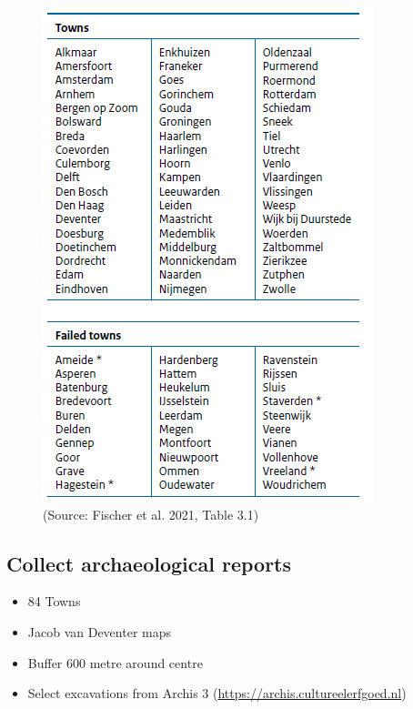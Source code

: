 \documentclass[
  letterpaper,
  DIV=11,
  numbers=noendperiod]{scrartcl}
\providecommand{\tightlist}{%
  \setlength{\itemsep}{0pt}\setlength{\parskip}{0pt}}\usepackage{longtable,booktabs,array}
\begin{document}
\begin{figure}

{\centering \includegraphics{images/Table_3.1.png}

}

\caption{(Source: Fischer et al. 2021, Table 3.1)}

\end{figure}

\hypertarget{collect-archaeological-reports}{%
\subsection{Collect archaeological
reports}\label{collect-archaeological-reports}}

\begin{itemize}
\tightlist
\item
  84 Towns
\item
  Jacob van Deventer maps
\item
  Buffer 600 metre around centre
\item
  Select excavations from Archis 3
  (\url{https://archis.cultureelerfgoed.nl})
\end{itemize}
\end{document}
